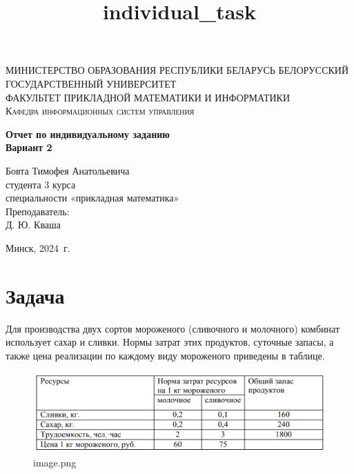\documentclass[11pt]{article}
\title{individual\_task}
\begin{document}
    
    \begin{titlepage}
    	\begin{center}
    		\textsc{МИНИСТЕРСТВО ОБРАЗОВАНИЯ РЕСПУБЛИКИ БЕЛАРУСЬ БЕЛОРУССКИЙ ГОСУДАРСТВЕННЫЙ УНИВЕРСИТЕТ
    			\\[5mm]
    			ФАКУЛЬТЕТ ПРИКЛАДНОЙ МАТЕМАТИКИ И ИНФОРМАТИКИ\\[2mm]
    			Кафедра информационных систем управления
    		}
    		
    		\vfill
    		
    		\textbf{Отчет по индивидуальному заданию\\
    			Вариант 2
    			\\[26mm]
    		}
    	\end{center}
    	
    	\hfill
    	\begin{minipage}{.5\textwidth}
    		\begin{flushright}
    			Бовта Тимофея Анатольевича\\
    			студента 3 курса\\
    			специальности «прикладная математика»\\[5mm]
    			
    			Преподаватель:\\[2mm] 
    			Д. Ю. Кваша\\
    		\end{flushright}
    	\end{minipage}%
    	\vfill
    	\begin{center}
    		Минск, 2024\ г.
    	\end{center}
    \end{titlepage}
    
    

    
    \section{Задача}\label{ux437ux430ux434ux430ux447ux430}

    Для производства двух сортов мороженого (сливочного и молочного)
комбинат использует сахар и сливки. Нормы затрат этих продуктов,
суточные запасы, а также цена реализации по каждому виду мороженого
приведены в таблице.

\begin{figure}
\centering
\includegraphics{image.png}
\caption{image.png}
\end{figure}
\end{document}
